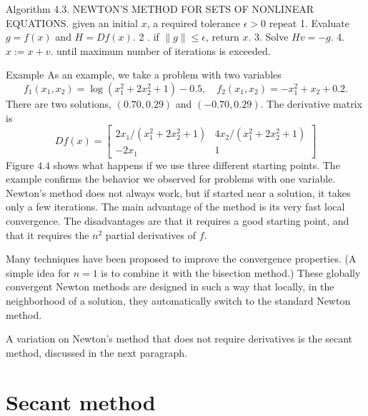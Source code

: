 \begin{algorithm}
    Algorithm 4.3. NEWTON'S METHOD FOR SETS OF NONLINEAR EQUATIONS.
given an initial $ x $, a required tolerance $ \epsilon>0 $
repeat
1. Evaluate $ g=f(x) $ and $ H=D f(x) $.
2 . if $ \|g\| \leq \epsilon $, return $ x $.
3. Solve $ H v=-g $.
4. $ x:=x+v $.
until maximum number of iterations is exceeded.
\end{algorithm}

\begin{example}
    Example As an example, we take a problem with two variables
\begin{equation}
f_{1}\left(x_{1}, x_{2}\right)=\log \left(x_{1}^{2}+2 x_{2}^{2}+1\right)-0.5, \quad f_{2}\left(x_{1}, x_{2}\right)=-x_{1}^{2}+x_{2}+0.2 .
\end{equation}
There are two solutions, $ (0.70,0.29) $ and $ (-0.70,0.29) $. The derivative matrix is
\begin{equation}
D f(x)=\left[\begin{array}{cc}
2 x_{1} /\left(x_{1}^{2}+2 x_{2}^{2}+1\right) & 4 x_{2} /\left(x_{1}^{2}+2 x_{2}^{2}+1\right) \\
-2 x_{1} & 1
\end{array}\right]
\end{equation}
Figure $ 4.4 $ shows what happens if we use three different starting points.
The example confirms the behavior we observed for problems with one variable. Newton's method does not always work, but if started near a solution, it takes only a few iterations. The main advantage of the method is its very fast local convergence. The disadvantages are that it requires a good starting point, and that it requires the $ n^{2} $ partial derivatives of $ f $.

Many techniques have been proposed to improve the convergence properties. (A simple idea for $ n=1 $ is to combine it with the bisection method.) These globally convergent Newton methods are designed in such a way that locally, in the neighborhood of a solution, they automatically switch to the standard Newton method.

A variation on Newton's method that does not require derivatives is the secant method, discussed in the next paragraph.
\end{example}

\section{Secant method}

